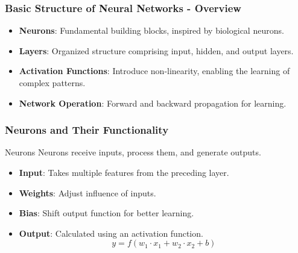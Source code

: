 \documentclass{beamer}
\begin{document}
\begin{frame}[fragile]
    \frametitle{Basic Structure of Neural Networks - Overview}
    \begin{itemize}
        \item \textbf{Neurons}: Fundamental building blocks, inspired by biological neurons.
        \item \textbf{Layers}: Organized structure comprising input, hidden, and output layers.
        \item \textbf{Activation Functions}: Introduce non-linearity, enabling the learning of complex patterns.
        \item \textbf{Network Operation}: Forward and backward propagation for learning.
    \end{itemize}
\end{frame}

\begin{frame}[fragile]
    \frametitle{Neurons and Their Functionality}
    \begin{block}{Neurons}
        Neurons receive inputs, process them, and generate outputs.
    \end{block}
    \begin{itemize}
        \item \textbf{Input}: Takes multiple features from the preceding layer.
        \item \textbf{Weights}: Adjust influence of inputs.
        \item \textbf{Bias}: Shift output function for better learning.
        \item \textbf{Output}: Calculated using an activation function.
        \begin{equation}
            y = f(w_1 \cdot x_1 + w_2 \cdot x_2 + b)
        \end{equation}
    \end{itemize}
\end{frame}
\end{document}
